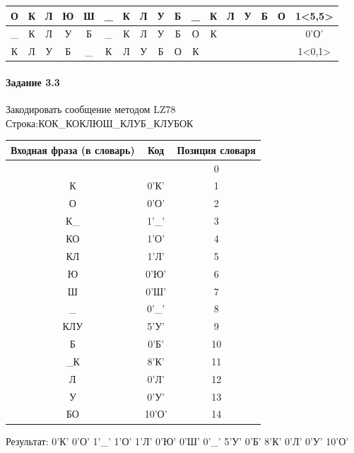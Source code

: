 \documentclass[a4paper, 12pt]{article}
\begin{document}
\begin{table}[h!]
\begin{tabular}{|c|c|c|c|c|c|c|c|c|c|c|c|c|c|c|c|c|}
О & К & Л & Ю & Ш & \cellcolor[HTML]{FFFF00} \_ & \cellcolor[HTML]{FFFF00} К & \cellcolor[HTML]{FFFF00} Л & \cellcolor[HTML]{FFFF00} У & \cellcolor[HTML]{FFFF00} Б & \cellcolor[HTML]{FFFF00} \_ & \cellcolor[HTML]{FFFF00} К & \cellcolor[HTML]{FFFF00} Л & \cellcolor[HTML]{FFFF00} У & \cellcolor[HTML]{FFFF00} Б & О & 1<5,5>\\ \hline
\_ & К & Л & У & Б & \_ & К & Л & У & Б & О & К &   &   &   &   & 0'О'\\ \hline
\cellcolor[HTML]{FFFF00} К & Л & У & Б & \_ & К & Л & У & Б & О & \cellcolor[HTML]{FFFF00} К &   &   &   &   &   & 1<0,1>\\ \hline
\end{tabular}
\end{table}

\paragraph{Задание 3.3}

Закодировать сообщение методом LZ78\\
Строка:КОК\_КОКЛЮШ\_КЛУБ\_КЛУБОК\\
\begin{table}[h!]
\centering
\begin{tabular}{|c|c|c|} 
\hline
 Входная фраза (в словарь) & Код & Позиция словаря \\ \hline

 &  & 0 \\ \hline
К & 0'К' & 1 \\ \hline
О & 0'О' & 2 \\ \hline
К\_ & 1'\_' & 3 \\ \hline
КО & 1'О' & 4 \\ \hline
КЛ & 1'Л' & 5 \\ \hline
Ю & 0'Ю' & 6 \\ \hline
Ш & 0'Ш' & 7 \\ \hline
\_ & 0'\_' & 8 \\ \hline
КЛУ & 5'У' & 9 \\ \hline
Б & 0'Б' & 10 \\ \hline
\_К & 8'К' & 11 \\ \hline
Л & 0'Л' & 12 \\ \hline
У & 0'У' & 13 \\ \hline
БО & 10'О' & 14 \\ \hline
\end{tabular}
\end{table}

Результат: 0'К' 0'О' 1'\_' 1'О' 1'Л' 0'Ю' 0'Ш' 0'\_' 5'У' 0'Б' 8'К' 0'Л' 0'У' 10'О'\\
\pagebreak
\end{document}
